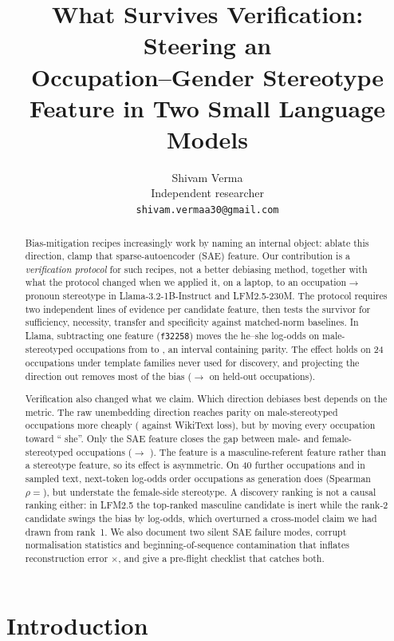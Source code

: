 \documentclass{article}
\title{What Survives Verification: Steering an\\ Occupation--Gender Stereotype
Feature in Two Small Language Models}
\author{%
  Shivam Verma\\
  Independent researcher\\
  \texttt{shivam.vermaa30@gmail.com}
}
\newcommand{\ff}[1]{\texttt{f#1}}
\begin{document}
\maketitle

\begin{abstract}
Bias-mitigation recipes increasingly work by naming an internal object: ablate this
direction, clamp that sparse-autoencoder (SAE) feature. Our contribution is a
\emph{verification protocol} for such recipes, not a better debiasing method, together
with what the protocol changed when we applied it, on a laptop, to an
occupation$\rightarrow$pronoun stereotype in Llama-3.2-1B-Instruct and LFM2.5-230M. The
protocol requires two independent lines of evidence per candidate feature, then tests the
survivor for sufficiency, necessity, transfer and specificity against matched-norm
baselines. In Llama, subtracting one feature (\ff{32258}) moves the
he--she log-odds on male-stereotyped occupations from \BaseMale{} \BaseMaleCI{} to
\SteerMale{} \SteerMaleCI{}, an interval containing parity. The effect holds on 24
occupations under template families never used for discovery, and projecting the
direction out removes most of the bias (\HeldBase{}${}\to{}$\ProjHeld{} on held-out
occupations).

Verification also changed what we claim. Which direction debiases best depends on the
metric. The raw unembedding direction reaches parity on male-stereotyped occupations more
cheaply (\DlossUnembed{} against \DlossSAE{} WikiText loss), but by moving every
occupation toward `` she''. Only the SAE feature closes the gap between male- and
female-stereotyped occupations (\GapBase{}${}\to{}$\GapSaeEight{} \GapSaeEightCI{}).
The feature is a masculine-referent feature rather than a stereotype feature, so its effect
is asymmetric. On 40 further occupations and in sampled text, next-token log-odds order
occupations as generation does (Spearman $\rho={}$\ValidRawRho), but understate the
female-side stereotype. A discovery ranking is not a causal ranking either: in LFM2.5 the
top-ranked masculine candidate is inert while the rank-2 candidate swings the bias by
\LfmRankTwoSwing{} log-odds, which overturned a cross-model claim we had drawn from
rank~1. We also document two silent SAE failure modes, corrupt normalisation statistics
and beginning-of-sequence contamination that inflates reconstruction error
\BosInflation$\times$, and give a pre-flight checklist that catches both.
\end{abstract}

\section{Introduction}
\end{document}
